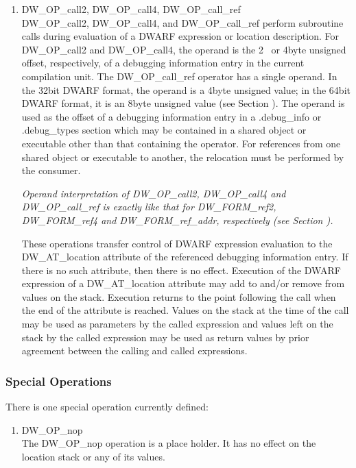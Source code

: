 \begin{enumerate}[1]
\item DW\_OP\_call2, DW\_OP\_call4, DW\_OP\_call\_ref \\
DW\_OP\_call2, DW\_OP\_call4, and DW\_OP\_call\_ref perform
subroutine calls during evaluation of a DWARF expression or
location description. 
For DW\_OP\_call2 and 
DW\-\_OP\-\_call4, 
the
operand is the 2\dash~ or 4\dash byte 
unsigned offset, respectively,
of a debugging information entry in the current compilation
unit. The DW\_OP\_call\_ref operator has a single operand. In the
32\dash bit DWARF format, the operand is a 4\dash byte unsigned value;
in the 64\dash bit DWARF format, it is an 8\dash byte unsigned value
(see Section ). 
The operand is used as the offset of a
debugging information entry in a .debug\_info or .debug\_types
section which may be contained in a shared object or executable
other than that containing the operator. For references from
one shared object or executable to another, the relocation
must be performed by the consumer.  

\textit{Operand interpretation of
DW\_OP\_call2, DW\_OP\_call4 and DW\_OP\_call\_ref is exactly like
that for DW\_FORM\_ref2, DW\_FORM\_ref4 and DW\_FORM\_ref\_addr,
respectively  
(see Section  ).  
}

These operations transfer
control of DWARF expression evaluation to the 
DW\-\_AT\-\_location
attribute of the referenced debugging information entry. If
there is no such attribute, then there is no effect. Execution
of the DWARF expression of a DW\-\_AT\-\_location attribute may add
to and/or remove from values on the stack. Execution returns
to the point following the call when the end of the attribute
is reached. Values on the stack at the time of the call may be
used as parameters by the called expression and values left on
the stack by the called expression may be used as return values
by prior agreement between the calling and called expressions.
\end{enumerate}


\subsubsection{Special Operations}
There is one special operation currently defined:
\begin{enumerate}[1]
\item DW\_OP\_nop \\
The DW\_OP\_nop operation is a place holder. It has no effect
on the location stack or any of its values.

\end{enumerate}
